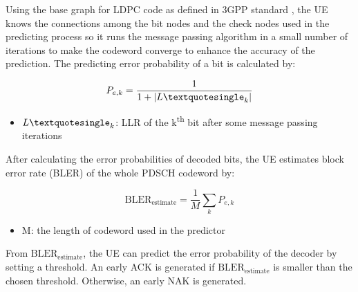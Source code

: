 \documentclass[conference]{IEEEtran}
\begin{document}
Using the base graph for LDPC code as defined in 3GPP standard \cite{b8}, the UE knows the connections among the bit nodes and the check nodes used in the predicting process so it runs the message passing algorithm in a small number of iterations to make the codeword converge to enhance the accuracy of the prediction. The predicting error probability of a bit is calculated by:

\begin{equation}
    P_{e,k} = \frac{1}{1 + |L\textquotesingle_{k}|}
\end{equation}

\begin{itemize}
    \item $L\textquotesingle_{k}$: LLR of the k\textsuperscript{th} bit after some message passing iterations
\end{itemize}

After calculating the error probabilities of decoded bits, the UE estimates block error rate (BLER) of the whole PDSCH codeword by:

\begin{equation}
   \mathrm{BLER}_{\mathrm{estimate}} = \frac{1}{M} \sum_{k} P_{e,k}
\end{equation}

\begin{itemize}
    \item M: the length of codeword used in the predictor
\end{itemize}

From $\mathrm{BLER}_{\mathrm{estimate}}$, the UE can predict the error probability of the decoder by setting a threshold. An early ACK is generated if $\mathrm{BLER}_{\mathrm{estimate}}$ is smaller than the chosen threshold. Otherwise, an early NAK is generated. 
\end{document}
